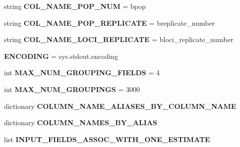 \begin{DoxyCompactItemize}
\item 
string {\bfseries C\+O\+L\+\_\+\+N\+A\+M\+E\+\_\+\+P\+O\+P\+\_\+\+N\+UM} = b\textquotesingle{}pop\textquotesingle{}\hypertarget{classnegui_1_1pgneestimationtablefilemanager_1_1NeEstimationTableFileManager_ac6dadc64bf4ab45fe2ead08f605cc276}{}\label{classnegui_1_1pgneestimationtablefilemanager_1_1NeEstimationTableFileManager_ac6dadc64bf4ab45fe2ead08f605cc276}

\item 
string {\bfseries C\+O\+L\+\_\+\+N\+A\+M\+E\+\_\+\+P\+O\+P\+\_\+\+R\+E\+P\+L\+I\+C\+A\+TE} = b\textquotesingle{}replicate\+\_\+number\textquotesingle{}\hypertarget{classnegui_1_1pgneestimationtablefilemanager_1_1NeEstimationTableFileManager_ac323852be54941f13ad317c106568df6}{}\label{classnegui_1_1pgneestimationtablefilemanager_1_1NeEstimationTableFileManager_ac323852be54941f13ad317c106568df6}

\item 
string {\bfseries C\+O\+L\+\_\+\+N\+A\+M\+E\+\_\+\+L\+O\+C\+I\+\_\+\+R\+E\+P\+L\+I\+C\+A\+TE} = b\textquotesingle{}loci\+\_\+replicate\+\_\+number\textquotesingle{}\hypertarget{classnegui_1_1pgneestimationtablefilemanager_1_1NeEstimationTableFileManager_a31759fd86a06ca7c27b15db638ca3af8}{}\label{classnegui_1_1pgneestimationtablefilemanager_1_1NeEstimationTableFileManager_a31759fd86a06ca7c27b15db638ca3af8}

\item 
{\bfseries E\+N\+C\+O\+D\+I\+NG} = sys.\+stdout.\+encoding\hypertarget{classnegui_1_1pgneestimationtablefilemanager_1_1NeEstimationTableFileManager_ab1cdd099d8b8a1888c0c92536e6a4cd5}{}\label{classnegui_1_1pgneestimationtablefilemanager_1_1NeEstimationTableFileManager_ab1cdd099d8b8a1888c0c92536e6a4cd5}

\item 
int {\bfseries M\+A\+X\+\_\+\+N\+U\+M\+\_\+\+G\+R\+O\+U\+P\+I\+N\+G\+\_\+\+F\+I\+E\+L\+DS} = 4\hypertarget{classnegui_1_1pgneestimationtablefilemanager_1_1NeEstimationTableFileManager_a19c53bc6b2c4d360ab684168718ca05b}{}\label{classnegui_1_1pgneestimationtablefilemanager_1_1NeEstimationTableFileManager_a19c53bc6b2c4d360ab684168718ca05b}

\item 
int {\bfseries M\+A\+X\+\_\+\+N\+U\+M\+\_\+\+G\+R\+O\+U\+P\+I\+N\+GS} = 3000\hypertarget{classnegui_1_1pgneestimationtablefilemanager_1_1NeEstimationTableFileManager_a43783edc62efeaa008021ab202411657}{}\label{classnegui_1_1pgneestimationtablefilemanager_1_1NeEstimationTableFileManager_a43783edc62efeaa008021ab202411657}

\item 
dictionary {\bfseries C\+O\+L\+U\+M\+N\+\_\+\+N\+A\+M\+E\+\_\+\+A\+L\+I\+A\+S\+E\+S\+\_\+\+B\+Y\+\_\+\+C\+O\+L\+U\+M\+N\+\_\+\+N\+A\+ME}
\item 
dictionary {\bfseries C\+O\+L\+U\+M\+N\+\_\+\+N\+A\+M\+E\+S\+\_\+\+B\+Y\+\_\+\+A\+L\+I\+AS}
\item 
list {\bfseries I\+N\+P\+U\+T\+\_\+\+F\+I\+E\+L\+D\+S\+\_\+\+A\+S\+S\+O\+C\+\_\+\+W\+I\+T\+H\+\_\+\+O\+N\+E\+\_\+\+E\+S\+T\+I\+M\+A\+TE}
\end{DoxyCompactItemize}


